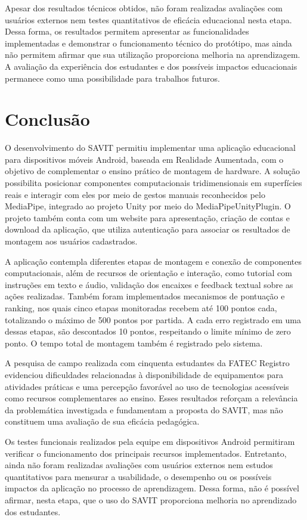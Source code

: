 \documentclass[11pt,a4paper]{article}
\begin{document}
Apesar dos resultados técnicos obtidos, não foram realizadas avaliações com usuários externos nem testes quantitativos de eficácia educacional nesta etapa. Dessa forma, os resultados permitem apresentar as funcionalidades implementadas e demonstrar o funcionamento técnico do protótipo, mas ainda não permitem afirmar que sua utilização proporciona melhoria na aprendizagem. A avaliação da experiência dos estudantes e dos possíveis impactos educacionais permanece como uma possibilidade para trabalhos futuros.


\section{Conclusão}

O desenvolvimento do SAVIT permitiu implementar uma aplicação educacional para dispositivos móveis Android, baseada em Realidade Aumentada, com o objetivo de complementar o ensino prático de montagem de hardware. A solução possibilita posicionar componentes computacionais tridimensionais em superfícies reais e interagir com eles por meio de gestos manuais reconhecidos pelo MediaPipe, integrado ao projeto Unity por meio do MediaPipeUnityPlugin. O projeto também conta com um website para apresentação, criação de contas e download da aplicação, que utiliza autenticação para associar os resultados de montagem aos usuários cadastrados.

A aplicação contempla diferentes etapas de montagem e conexão de componentes computacionais, além de recursos de orientação e interação, como tutorial com instruções em texto e áudio, validação dos encaixes e feedback textual sobre as ações realizadas. Também foram implementados mecanismos de pontuação e ranking, nos quais cinco etapas monitoradas recebem até 100 pontos cada, totalizando o máximo de 500 pontos por partida. A cada erro registrado em uma dessas etapas, são descontados 10 pontos, respeitando o limite mínimo de zero ponto. O tempo total de montagem também é registrado pelo sistema.

A pesquisa de campo realizada com cinquenta estudantes da FATEC Registro evidenciou dificuldades relacionadas à disponibilidade de equipamentos para atividades práticas e uma percepção favorável ao uso de tecnologias acessíveis como recursos complementares ao ensino. Esses resultados reforçam a relevância da problemática investigada e fundamentam a proposta do SAVIT, mas não constituem uma avaliação de sua eficácia pedagógica.

Os testes funcionais realizados pela equipe em dispositivos Android permitiram verificar o funcionamento dos principais recursos implementados. Entretanto, ainda não foram realizadas avaliações com usuários externos nem estudos quantitativos para mensurar a usabilidade, o desempenho ou os possíveis impactos da aplicação no processo de aprendizagem. Dessa forma, não é possível afirmar, nesta etapa, que o uso do SAVIT proporciona melhoria no aprendizado dos estudantes.
\end{document}

